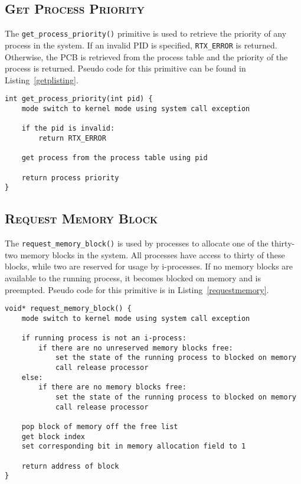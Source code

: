 \documentclass[oneside]{report}
\begin{document}
\subsection{\textsc{Get Process Priority}}
The \texttt{get\_process\_priority()} primitive is used to retrieve the
priority of any process in the system. If an invalid PID is specified,
\texttt{RTX\_ERROR} is returned. Otherwise, the PCB is retrieved from
the process table and the priority of the process is returned. Pseudo
code for this primitive can be found in Listing~\ref{getplisting}.

\begin{lstlisting}
int get_process_priority(int pid) {
    mode switch to kernel mode using system call exception
    
    if the pid is invalid:
        return RTX_ERROR

    get process from the process table using pid
    
    return process priority
}
\end{lstlisting}

\subsection{\textsc{Request Memory Block}}

The \texttt{request\_memory\_block()} is used by processes to allocate
one of the thirty-two memory blocks in the system. All processes have
access to thirty of these blocks, while two are reserved for usage by
i-processes. If no memory blocks are available to the running process,
it becomes blocked on memory and is preempted. Pseudo code for this
primitive is in Listing~\ref{requestmemory}.

\begin{lstlisting}
void* request_memory_block() {
    mode switch to kernel mode using system call exception

    if running process is not an i-process:
        if there are no unreserved memory blocks free:
            set the state of the running process to blocked on memory
            call release processor
    else:
        if there are no memory blocks free:
            set the state of the running process to blocked on memory
            call release processor

    pop block of memory off the free list        
    get block index
    set corresponding bit in memory allocation field to 1

    return address of block
}
\end{lstlisting}
\end{document}
